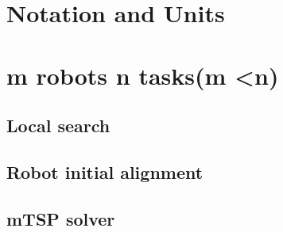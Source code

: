 \documentclass[a4paper]{article}
\begin{document}


\section{Notation and Units}



\section{m robots n tasks(m \textless n)}

\subsection{Local search}


\subsection{Robot initial alignment}


\subsection{mTSP solver}


\end{document}
